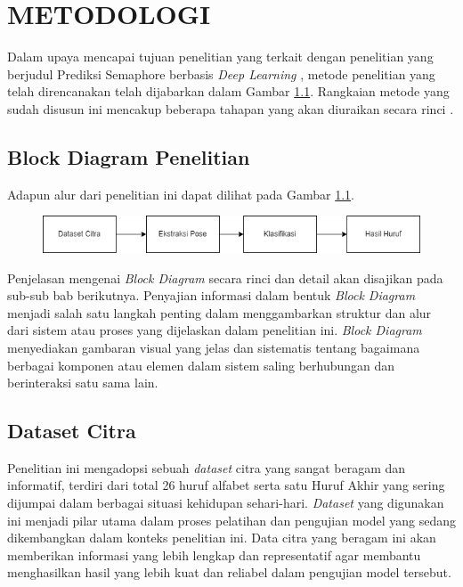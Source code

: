 \chapter{METODOLOGI}


Dalam upaya mencapai tujuan penelitian yang terkait dengan penelitian yang berjudul Prediksi Semaphore berbasis \textit{Deep Learning }, metode penelitian yang telah direncanakan telah dijabarkan dalam Gambar \ref{fig:blokdiagram}. Rangkaian metode yang sudah disusun ini mencakup beberapa tahapan yang akan diuraikan secara rinci .

\section{Block Diagram Penelitian}
Adapun alur dari penelitian ini dapat dilihat pada Gambar \ref{fig:blokdiagram}.
\begin{figure}[hbt!]
	\centering
	\includegraphics[width=1.0\linewidth]{gambar/metodologi_kerja.png}
	\label{fig:blokdiagram}
\end{figure}

Penjelasan mengenai \textit{Block Diagram} secara rinci dan detail akan disajikan pada sub-sub bab berikutnya. Penyajian informasi dalam bentuk \textit{Block Diagram} menjadi salah satu langkah penting dalam menggambarkan struktur dan alur dari sistem atau proses yang dijelaskan dalam penelitian ini. \textit{Block Diagram} menyediakan gambaran visual yang jelas dan sistematis tentang bagaimana berbagai komponen atau elemen dalam sistem saling berhubungan dan berinteraksi satu sama lain.

\section{Dataset Citra}
Penelitian ini mengadopsi sebuah \textit{dataset} citra yang sangat beragam dan informatif, terdiri dari total 26 huruf alfabet serta satu Huruf Akhir yang sering dijumpai dalam berbagai situasi kehidupan sehari-hari. \textit{Dataset} yang digunakan ini menjadi pilar utama dalam proses pelatihan dan pengujian model yang sedang dikembangkan dalam konteks penelitian ini. Data citra yang beragam ini akan memberikan informasi yang lebih lengkap dan representatif agar membantu menghasilkan hasil yang lebih kuat dan reliabel dalam pengujian model tersebut.

